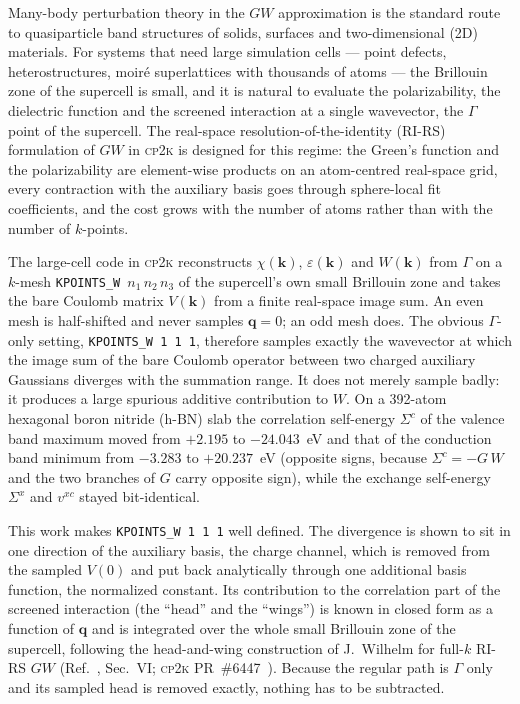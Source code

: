 \documentclass[%
 reprint,
superscriptaddress,
 amsmath,amssymb,
 aps,
prb,
]{revtex4-2}
\newcommand{\bq}{\mathbf{q}}
\newcommand{\bk}{\mathbf{k}}
\newcommand{\cpk}{\textsc{cp2k}}
\begin{document}
Many-body perturbation theory in the $GW$ approximation is the standard route to quasiparticle
band structures of solids, surfaces and two-dimensional (2D) materials. For systems that need
large simulation cells --- point defects, heterostructures, moir\'e superlattices with thousands
of atoms --- the Brillouin zone of the supercell is small, and it is natural to evaluate the
polarizability, the dielectric function and the screened interaction at a single wavevector,
the $\Gamma$ point of the supercell. The real-space resolution-of-the-identity (RI-RS)
formulation of $GW$ in \cpk{} is designed for this regime: the Green's function and the
polarizability are element-wise products on an atom-centred real-space grid, every contraction
with the auxiliary basis goes through sphere-local fit coefficients, and the cost grows with the
number of atoms rather than with the number of $k$-points.

The large-cell code in \cpk{} reconstructs $\chi(\bk)$, $\varepsilon(\bk)$ and $W(\bk)$ from
$\Gamma$ on a $k$-mesh \texttt{KPOINTS\_W}~$n_1\,n_2\,n_3$ of the supercell's own small
Brillouin zone and takes the bare Coulomb matrix $V(\bk)$ from a finite real-space image sum.
An even mesh is half-shifted and never samples $\bq=0$; an odd mesh does. The obvious $\Gamma$-only
setting, \texttt{KPOINTS\_W 1 1 1}, therefore samples exactly the wavevector at which the image
sum of the bare Coulomb operator between two charged auxiliary Gaussians diverges with the
summation range. It does not merely sample badly: it produces a large spurious additive
contribution to $W$. On a 392-atom hexagonal boron nitride (h-BN) slab the correlation
self-energy $\Sigma^c$ of the valence band maximum moved from $+2.195$ to $-24.043$~eV and that
of the conduction band minimum from $-3.283$ to $+20.237$~eV (opposite signs, because
$\Sigma^c=-G\,W$ and the two branches of $G$ carry opposite sign), while the exchange
self-energy $\Sigma^x$ and $v^{xc}$ stayed bit-identical.

This work makes \texttt{KPOINTS\_W 1 1 1} well defined. The divergence is shown to sit in one
direction of the auxiliary basis, the charge channel, which is removed from the sampled $V(0)$
and put back analytically through one additional basis function, the normalized constant. Its
contribution to the correlation part of the screened interaction (the ``head'' and the
``wings'') is known in closed form as a function of $\bq$ and is integrated over the whole
small Brillouin zone of the supercell, following the head-and-wing construction of
J.~Wilhelm for full-$k$ RI-RS $GW$ (Ref.~, Sec.~VI; \cpk{}
PR~\#6447~\cite{pr6447}). Because the regular path is $\Gamma$ only and its sampled head is
removed exactly, nothing has to be subtracted.
\end{document}
